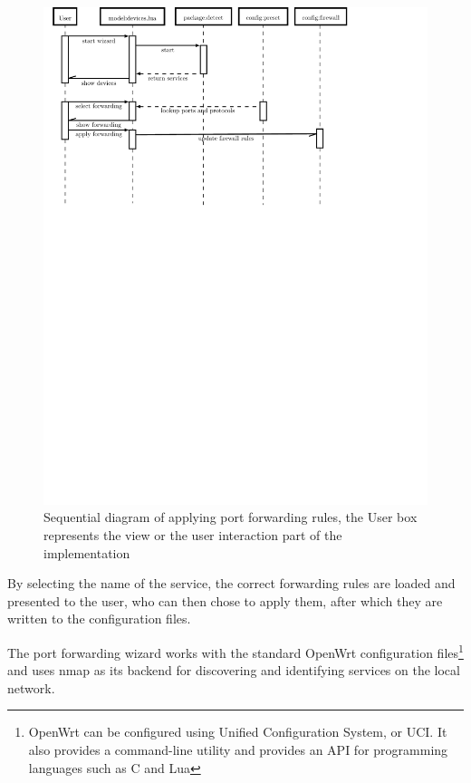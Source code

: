 \documentclass[a4paper,11pt,makeidx]{kth-bcs}
\begin{document}
\begin{figure}[h!]
   \centering
   \includegraphics[trim = 0mm 195mm 30mm 0mm, clip, width=15cm,natwidth=1.0in,natheight=1.0in]{wizard-seq_dia}
   \caption{Sequential diagram of applying port forwarding rules, the User box represents the view or the user interaction part of the implementation}
   \label{fig:wizard-seq_dia}
\end{figure}

By selecting the name of the service, the correct forwarding rules are loaded and presented to the user, who can then chose to apply them, after which they are written to the configuration files.

The port forwarding wizard works with the standard OpenWrt configuration files\footnote{OpenWrt can be configured using Unified Configuration System, or UCI. It also provides a command-line utility and provides an API for programming languages such as C and Lua} and uses nmap as its backend for discovering and identifying services on the local network.
\end{document}
